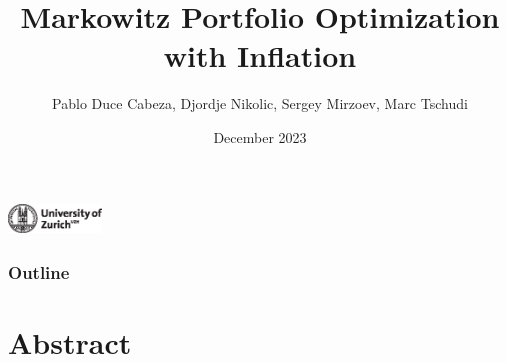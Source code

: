 \documentclass{beamer}
\title{Markowitz Portfolio Optimization with Inflation}
\author{Pablo Duce Cabeza, Djordje Nikolic, Sergey Mirzoev, Marc Tschudi}
\date{December 2023}
\begin{document}
\begin{frame}
\titlepage
\begin{center}
    \includegraphics[width=2.5cm,keepaspectratio]{figure/uzh_logo_e_pos.eps}
\end{center}
\end{frame}


\begin{frame}
\frametitle{Outline}
\tableofcontents
\end{frame}






\section{Abstract}
\end{document}
